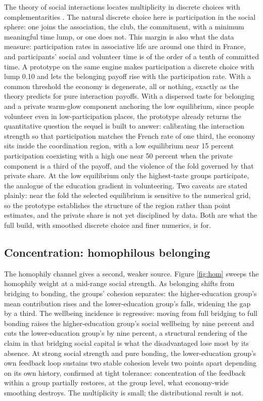 \documentclass[11pt]{article}
\begin{document}
The theory of social interactions locates multiplicity in discrete choices with complementarities \citep{brock2001}. The natural discrete choice here is participation in the social sphere: one joins the association, the club, the commitment, with a minimum meaningful time lump, or one does not. This margin is also what the data measure: participation rates in associative life are around one third in France, and participants' social and volunteer time is of the order of a tenth of committed time. A prototype on the same engine makes participation a discrete choice with lump 0.10 and lets the belonging payoff rise with the participation rate. With a common threshold the economy is degenerate, all or nothing, exactly as the theory predicts for pure interaction payoffs. With a dispersed taste for belonging and a private warm-glow component anchoring the low equilibrium, since people volunteer even in low-participation places, the prototype already returns the quantitative question the sequel is built to answer: calibrating the interaction strength so that participation matches the French rate of one third, the economy sits inside the coordination region, with a low equilibrium near 15 percent participation coexisting with a high one near 50 percent when the private component is a third of the payoff, and the violence of the fold governed by that private share. At the low equilibrium only the highest-taste groups participate, the analogue of the education gradient in volunteering. Two caveats are stated plainly: near the fold the selected equilibrium is sensitive to the numerical grid, so the prototype establishes the structure of the region rather than point estimates, and the private share is not yet disciplined by data. Both are what the full build, with smoothed discrete choice and finer numerics, is for.

\subsection{Concentration: homophilous belonging}

The homophily channel gives a second, weaker source. Figure \ref{fig:hom} sweeps the homophily weight at a mid-range social strength. As belonging shifts from bridging to bonding, the groups' cohesion separates: the higher-education group's mean contribution rises and the lower-education group's falls, widening the gap by a third. The wellbeing incidence is regressive: moving from full bridging to full bonding raises the higher-education group's social wellbeing by nine percent and cuts the lower-education group's by nine percent, a structural rendering of the claim in \citet{putnam2000} that bridging social capital is what the disadvantaged lose most by its absence. At strong social strength and pure bonding, the lower-education group's own feedback loop sustains two stable cohesion levels two points apart depending on its own history, confirmed at tight tolerance: concentration of the feedback within a group partially restores, at the group level, what economy-wide smoothing destroys. The multiplicity is small; the distributional result is not.
\end{document}
